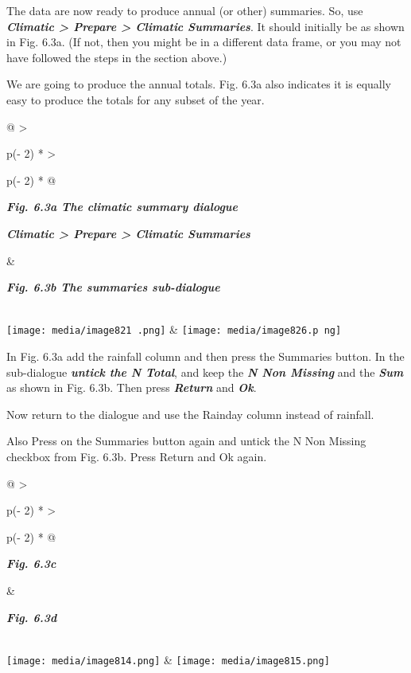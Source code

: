 \documentclass[
  letterpaper,
  DIV=11,
  numbers=noendperiod]{scrreprt}
\begin{document}
The data are now ready to produce annual (or other) summaries. So, use
\textbf{\emph{Climatic \textgreater{} Prepare \textgreater{} Climatic
Summaries}}. It should initially be as shown in Fig. 6.3a. (If not, then
you might be in a different data frame, or you may not have followed the
steps in the section above.)

We are going to produce the annual totals. Fig. 6.3a also indicates it
is equally easy to produce the totals for any subset of the year.

\begin{longtable}[]{@{}
  >{\raggedright\arraybackslash}p{(\columnwidth - 2\tabcolsep) * }
  >{\raggedright\arraybackslash}p{(\columnwidth - 2\tabcolsep) * }@{}}
\toprule\noalign{}
\begin{minipage}[b]{\linewidth}\raggedright
\textbf{\emph{Fig. 6.3a The climatic summary dialogue}}

\textbf{\emph{Climatic \textgreater{} Prepare \textgreater{} Climatic
Summaries}}
\end{minipage} & \begin{minipage}[b]{\linewidth}\raggedright
\textbf{\emph{Fig. 6.3b The summaries sub-dialogue}}
\end{minipage} \\
\midrule\noalign{}
\endhead
\bottomrule\noalign{}
\endlastfoot
\texttt{[image: media/image821 .png]}
&
\texttt{[image: media/image826.p ng]} \\
\end{longtable}

In Fig. 6.3a add the rainfall column and then press the Summaries
button. In the sub-dialogue \textbf{\emph{untick the N Total}}, and keep
the \textbf{\emph{N Non Missing}} and the \textbf{\emph{Sum}} as shown
in Fig. 6.3b. Then press \textbf{\emph{Return}} and \textbf{\emph{Ok}}.

Now return to the dialogue and use the Rainday column instead of
rainfall.

Also Press on the Summaries button again and untick the N Non Missing
checkbox from Fig. 6.3b. Press Return and Ok again.

\begin{longtable}[]{@{}
  >{\raggedright\arraybackslash}p{(\columnwidth - 2\tabcolsep) * }
  >{\raggedright\arraybackslash}p{(\columnwidth - 2\tabcolsep) * }@{}}
\toprule\noalign{}
\begin{minipage}[b]{\linewidth}\raggedright
\textbf{\emph{Fig. 6.3c}}
\end{minipage} & \begin{minipage}[b]{\linewidth}\raggedright
\textbf{\emph{Fig. 6.3d}}
\end{minipage} \\
\midrule\noalign{}
\endhead
\bottomrule\noalign{}
\endlastfoot
\texttt{[image: media/image814.png]} &
\texttt{[image: media/image815.png]} \\
\end{longtable}
\end{document}
